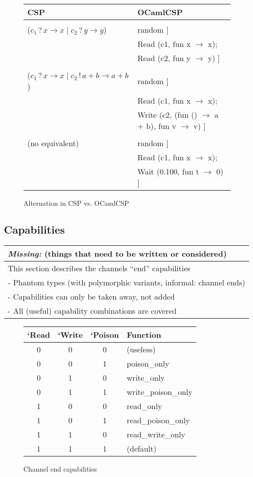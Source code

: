 \documentclass[11pt,oneside,a4paper]{article}
\newcommand{\missing}[1]{
\begin{tabular}{|p{11cm}|}
\hline
\emph{Missing:} {\scriptsize (things that need to be written or considered)} \\
\hline
#1
\hline
\end{tabular}
}
\begin{document}
\begin{figure}[h]
\centering
\begin{tabular}{l|l}
CSP & OCamlCSP \\
\hline
& \\
($c_1\,?\,x \to x \mid c_2\,?\,y \to y$) & random [ \\
& \quad Read (c1, fun x $\to$ x); \\
& \quad Read (c2, fun y $\to$ y) ] \\
& \\
($c_1\,?\,x \to x \mid c_2\,!\,a+b \to a+b$) & random [ \\
& \quad Read (c1, fun x $\to$ x); \\
& \quad Write (c2, (fun () $\to$ a + b), fun v $\to$ v) ] \\
& \\
(no equivalent) & random [ \\
& \quad Read (c1, fun x $\to$ x); \\
& \quad Wait (0.100, fun t $\to$ 0) ] \\
\end{tabular}
\caption{Alternation in CSP vs. OCamlCSP}
\label{channel-alternation}
\end{figure}

\subsection{Capabilities}
\missing{
This section describes the channels ``end'' capabilities \\
- Phantom types (with polymorphic variants, informal: channel ends) \\
- Capabilities can only be taken away, not added \\
- All (useful) capability combinations are covered \\
}

\begin{figure}[h]
\centering
\begin{tabular}{c|c|c|l}
`Read & `Write & `Poison & Function \\
\hline
0 & 0 & 0 & (useless) \\
0 & 0 & 1 & poison\_only \\
0 & 1 & 0 & write\_only \\
0 & 1 & 1 & write\_poison\_only \\
1 & 0 & 0 & read\_only \\
1 & 0 & 1 & read\_poison\_only \\
1 & 1 & 0 & read\_write\_only \\
1 & 1 & 1 & (default) \\
\end{tabular}
\caption{Channel end capabilities}
\label{channel-capabilities}
\end{figure}
\end{document}

